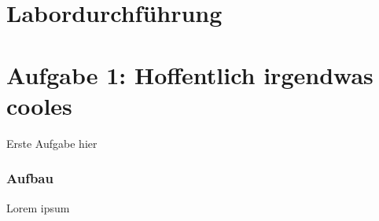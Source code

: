\section*{\textcolor{umitblau!75}{Labordurchführung}} %

\section*{Aufgabe 1: Hoffentlich irgendwas cooles}

Erste Aufgabe hier

\subsubsection*{Aufbau} %

Lorem ipsum